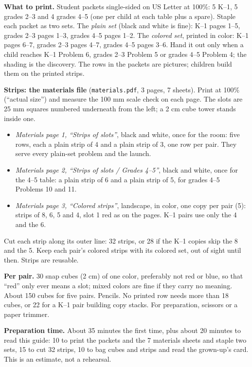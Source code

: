 \documentclass[11pt]{article}
\begin{document}
\textbf{What to print.} Student packets single-sided on US Letter at 100\%: 5 K--1, 5 grades 2--3 and 4 grades 4--5 (one per child at each table plus a spare). Staple each packet as two sets. The \emph{plain set} (black and white is fine): K--1 pages 1--5, grades 2--3 pages 1--3, grades 4--5 pages 1--2. The \emph{colored set}, printed in color: K--1 pages 6--7, grades 2--3 pages 4--7, grades 4--5 pages 3--6. Hand it out only when a child reaches K--1 Problem 6, grades 2--3 Problem 5 or grades 4--5 Problem 4; the shading is the discovery. The rows in the packets are pictures; children build them on the printed strips.

\textbf{Strips: the materials file} (\texttt{materials.pdf}, 3 pages, 7 sheets). Print at 100\% (``actual size'') and measure the 100 mm scale check on each page. The slots are 25 mm squares numbered underneath from the left; a 2 cm cube tower stands inside one.
\begin{itemize}[nosep,leftmargin=1.2em]
\item \emph{Materials page 1, ``Strips of slots''}, black and white, once for the room: five rows, each a plain strip of 4 and a plain strip of 3, one row per pair. They serve every plain-set problem and the launch.
\item \emph{Materials page 2, ``Strips of slots / Grades 4--5''}, black and white, once for the 4--5 table: a plain strip of 6 and a plain strip of 5, for grades 4--5 Problems 10 and 11.
\item \emph{Materials page 3, ``Colored strips''}, landscape, in color, one copy per pair (5): strips of 8, 6, 5 and 4, slot 1 red as on the pages. K--1 pairs use only the 4 and the 6.
\end{itemize}
Cut each strip along its outer line: 32 strips, or 28 if the K--1 copies skip the 8 and the 5. Keep each pair's colored strips with its colored set, out of sight until then. Strips are reusable.

\textbf{Per pair.} 30 snap cubes (2 cm) of one color, preferably not red or blue, so that ``red'' only ever means a slot; mixed colors are fine if they carry no meaning. About 150 cubes for five pairs. Pencils. No printed row needs more than 18 cubes, or 22 for a K--1 pair building copy stacks. For preparation, scissors or a paper trimmer.

\textbf{Preparation time.} About 35 minutes the first time, plus about 20 minutes to read this guide: 10 to print the packets and the 7 materials sheets and staple two sets, 15 to cut 32 strips, 10 to bag cubes and strips and read the grown-up's card. This is an estimate, not a rehearsal.
\end{document}
